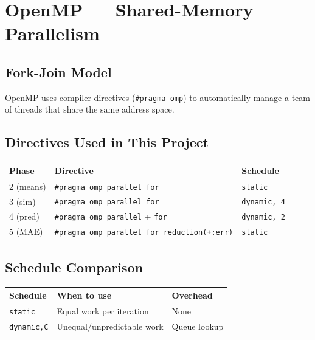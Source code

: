 \documentclass[12pt,a4paper]{report}
\begin{document}
\chapter{OpenMP — Shared-Memory Parallelism}

\section{Fork-Join Model}

OpenMP uses compiler directives (\texttt{\#pragma omp}) to automatically
manage a team of threads that share the same address space.

\section{Directives Used in This Project}

\begin{center}
\begin{tabular}{lll}
\toprule
Phase & Directive & Schedule \\
\midrule
2 (means) & \texttt{\#pragma omp parallel for} & \texttt{static} \\
3 (sim) & \texttt{\#pragma omp parallel for} & \texttt{dynamic, 4} \\
4 (pred) & \texttt{\#pragma omp parallel} + \texttt{for} & \texttt{dynamic, 2} \\
5 (MAE) & \texttt{\#pragma omp parallel for reduction(+:err)} & \texttt{static} \\
\bottomrule
\end{tabular}
\end{center}

\section{Schedule Comparison}

\begin{center}
\begin{tabular}{lp{6cm}l}
\toprule
Schedule & When to use & Overhead \\
\midrule
\texttt{static} & Equal work per iteration & None \\
\texttt{dynamic,C} & Unequal/unpredictable work & Queue lookup \\
\bottomrule
\end{tabular}
\end{center}
\end{document}
